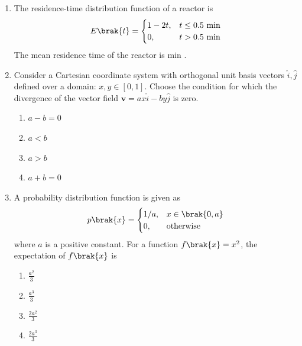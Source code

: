 \documentclass[journal,12pt,onecolumn]{IEEEtran}
\theoremstyle{remark}
\begin{document}
\begin{enumerate}
		\hfill{}
		
		\item The residence-time distribution  function of a reactor  is
		 \begin{align}
		 E\brak{t} = \begin{cases} 1 - 2t, & t \le 0.5 \text{ min} \\ 0, & t > 0.5 \text{ min} \end{cases} 
		 \end{align}
		The mean residence time of the reactor is \underline{\hspace{2cm}} min .
		
		\hfill{}
		
		\item Consider a Cartesian coordinate system with orthogonal unit basis vectors $\hat{i}, \hat{j}$ defined over a domain: $x, y \in [0,1]$. Choose the condition for which the divergence of the vector field $\mathbf{v} = ax\hat{i} - by\hat{j}$ is zero.
		
		\hfill{}
		
		\begin{enumerate}
			\item $a - b = 0$
			\item $a < b$
			\item $a > b$
			\item $a + b = 0$
		\end{enumerate}
		
		\item A probability distribution function is given as
		\[ p\brak{x} = \begin{cases} 1/a, & x \in \brak{0, a} \\ 0, & \text{otherwise} \end{cases} \]
		where $a$ is a positive constant. For a function $f\brak{x} = x^2$, the expectation of $f\brak{x}$ is
		
		\hfill{}
		
		\begin{multicols}{2}
			\begin{enumerate}
				\item $\frac{a^2}{3}$
				\item $\frac{a^3}{3}$
				\item $\frac{2a^2}{3}$
				\item $\frac{2a^3}{3}$
			\end{enumerate}
		\end{multicols}
		

\end{enumerate}
\end{document}
